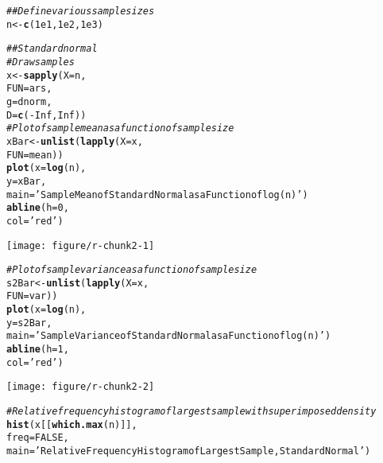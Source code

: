 \documentclass{article}\usepackage[]{graphicx}\usepackage[]{color}
\makeatletter
\def\maxwidth{ %
  \ifdim\Gin@nat@width>\linewidth
    \linewidth
  \else
    \Gin@nat@width
  \fi
}
\newcommand{\hlnum}[1]{\textcolor[rgb]{0.686,0.059,0.569}{#1}}%
\newcommand{\hlstr}[1]{\textcolor[rgb]{0.192,0.494,0.8}{#1}}%
\newcommand{\hlcom}[1]{\textcolor[rgb]{0.678,0.584,0.686}{\textit{#1}}}%
\newcommand{\hlopt}[1]{\textcolor[rgb]{0,0,0}{#1}}%
\newcommand{\hlstd}[1]{\textcolor[rgb]{0.345,0.345,0.345}{#1}}%
\newcommand{\hlkwb}[1]{\textcolor[rgb]{0.69,0.353,0.396}{#1}}%
\newcommand{\hlkwc}[1]{\textcolor[rgb]{0.333,0.667,0.333}{#1}}%
\newcommand{\hlkwd}[1]{\textcolor[rgb]{0.737,0.353,0.396}{\textbf{#1}}}%
\newenvironment{kframe}{%
 \def\at@end@of@kframe{}%
 \ifinner\ifhmode%
  \def\at@end@of@kframe{\end{minipage}}%
  \begin{minipage}{\columnwidth}%
 \fi\fi%
 \def\FrameCommand##1{\hskip\@totalleftmargin \hskip-\fboxsep
 \colorbox{shadecolor}{##1}\hskip-\fboxsep
     \hskip-\linewidth \hskip-\@totalleftmargin \hskip\columnwidth}%
 \MakeFramed {\advance\hsize-\width
   \@totalleftmargin\z@ \linewidth\hsize
   \@setminipage}}%
 {\par\unskip\endMakeFramed%
 \at@end@of@kframe}
\newenvironment{knitrout}{}{} %
\makeatother
\begin{document}
\begin{knitrout}
\color{fgcolor}\begin{kframe}
\begin{alltt}
  \hlcom{## Define various sample sizes}
  \hlstd{n} \hlkwb{<-} \hlkwd{c}\hlstd{(}\hlnum{1e1}\hlstd{,}\hlnum{1e2}\hlstd{,}\hlnum{1e3}\hlstd{)}

  \hlcom{## Standard normal}
  \hlcom{# Draw samples}
  \hlstd{x} \hlkwb{<-} \hlkwd{sapply}\hlstd{(}\hlkwc{X} \hlstd{= n,}
              \hlkwc{FUN} \hlstd{= ars,}
              \hlkwc{g} \hlstd{= dnorm,}
              \hlkwc{D} \hlstd{=} \hlkwd{c}\hlstd{(}\hlopt{-}\hlnum{Inf}\hlstd{,}\hlnum{Inf}\hlstd{))}
  \hlcom{# Plot of sample mean as a function of sample size}
  \hlstd{xBar} \hlkwb{<-} \hlkwd{unlist}\hlstd{(}\hlkwd{lapply}\hlstd{(}\hlkwc{X} \hlstd{= x,}
                        \hlkwc{FUN} \hlstd{= mean))}
  \hlkwd{plot}\hlstd{(}\hlkwc{x} \hlstd{=} \hlkwd{log}\hlstd{(n),}
       \hlkwc{y} \hlstd{= xBar,}
       \hlkwc{main} \hlstd{=} \hlstr{'Sample Mean of Standard Normal as a Function of log(n)'}\hlstd{)}
  \hlkwd{abline}\hlstd{(}\hlkwc{h} \hlstd{=} \hlnum{0}\hlstd{,}
         \hlkwc{col} \hlstd{=} \hlstr{'red'}\hlstd{)}
\end{alltt}
\end{kframe}
\texttt{[image: figure/r-chunk2-1]} 
\begin{kframe}\begin{alltt}
  \hlcom{# Plot of sample variance as a function of sample size}
  \hlstd{s2Bar} \hlkwb{<-} \hlkwd{unlist}\hlstd{(}\hlkwd{lapply}\hlstd{(}\hlkwc{X} \hlstd{= x,}
                         \hlkwc{FUN} \hlstd{= var))}
  \hlkwd{plot}\hlstd{(}\hlkwc{x} \hlstd{=} \hlkwd{log}\hlstd{(n),}
       \hlkwc{y} \hlstd{= s2Bar,}
       \hlkwc{main} \hlstd{=} \hlstr{'Sample Variance of Standard Normal as a Function of log(n)'}\hlstd{)}
  \hlkwd{abline}\hlstd{(}\hlkwc{h} \hlstd{=} \hlnum{1}\hlstd{,}
         \hlkwc{col} \hlstd{=} \hlstr{'red'}\hlstd{)}
\end{alltt}
\end{kframe}
\texttt{[image: figure/r-chunk2-2]} 
\begin{kframe}\begin{alltt}
  \hlcom{# Relative frequency histogram of largest sample with superimposed density}
  \hlkwd{hist}\hlstd{(x[[}\hlkwd{which.max}\hlstd{(n)]],}
       \hlkwc{freq} \hlstd{=} \hlnum{FALSE}\hlstd{,}
       \hlkwc{main} \hlstd{=} \hlstr{'Relative Frequency Histogram of Largest Sample, Standard Normal'}\hlstd{)}

\end{alltt}
\end{kframe}
\end{knitrout}
\end{document}
